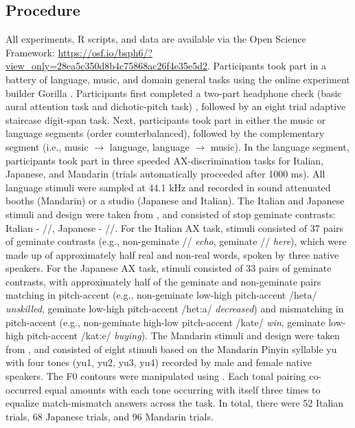 \documentclass[a4paper]{article}
\begin{document}
\subsection{Procedure}
All experiments, R scripts, and data are available via the Open Science Framework: \url{https://osf.io/bsph6/?view_only=28ea5c350d8b4c75868ac26f4e35e5d2}. Participants took part in a battery of language, music, and domain general tasks using the online experiment builder Gorilla \cite{gorilla_Anwyl-Irvine_2019}. Participants first completed a two-part headphone check (basic aural attention task and dichotic-pitch task) \cite{milne_2021}, followed by an eight trial adaptive staircase digit-span task. Next, participants took part in either the music or language segments (order counterbalanced), followed by the complementary segment (i.e., music $\rightarrow$ language, language $\rightarrow$ music). In the language segment, participants took part in three speeded AX-discrimination tasks for Italian, Japanese, and Mandarin (trials automatically proceeded after 1000 ms). All language stimuli were sampled at 44.1 kHz and recorded in sound attenuated booths (Mandarin) or a studio (Japanese and Italian). The Italian and Japanese stimuli and design were taken from \cite{Tsukada_Cox_Hajek_Hirata_2017}, and consisted of stop geminate contrasts: Italian - //, Japanese - //. For the Italian AX task, stimuli consisted of 37 pairs of geminate contrasts (e.g., non-geminate // \textit{echo}, geminate // \textit{here}), which were made up of approximately half real and non-real words, spoken by three native speakers. For the Japanese AX task, stimuli consisted of 33 pairs of geminate contrasts, with approximately half of the geminate and non-geminate pairs matching in pitch-accent (e.g., non-geminate low-high pitch-accent /heta/ \textit{unskilled}, geminate low-high pitch-accent /het:a/ \textit{decreased}) and mismatching in pitch-accent (e.g., non-geminate high-low pitch-accent /kate/ \textit{win}, geminate low-high pitch-accent /kat:e/ \textit{buying}). The Mandarin stimuli and design were taken from \cite{Wiener_Bradley_2020}, and consisted of eight stimuli based on the Mandarin Pinyin syllable yu with four tones (yu1, yu2, yu3, yu4) recorded by male and female native speakers. The F0 contours were manipulated using \cite{Boersma_Weenink}. Each tonal pairing co-occurred equal amounts with each tone occurring with itself three times to equalize match-mismatch answers across the task. In total, there were  52 Italian trials, 68 Japanese trials, and 96 Mandarin trials.
\end{document}
